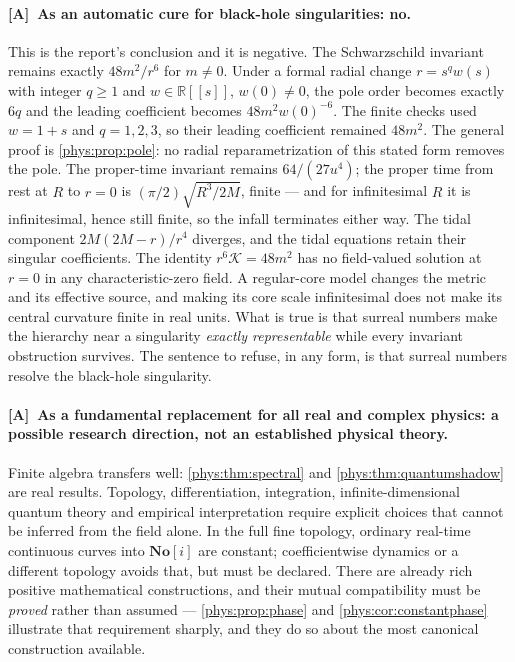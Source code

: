 \documentclass[11pt,letterpaper]{article}
\numberwithin{equation}{section}
\theoremstyle{definition}
\theoremstyle{remark}
\newcommand{\SC}{\mathbf{No}[i]}
\newcommand{\R}{\mathbb R}
\newcommand{\Kret}{\mathcal K}
\newcommand{\TA}{\textcolor{TierA}{\textsf{\bfseries[A]}}}
\begin{document}
\paragraph{\TA\ As an automatic cure for black-hole singularities: no.}
This is the report's conclusion and it is negative. The Schwarzschild invariant
remains exactly $48m^{2}/r^{6}$ for $m\ne0$. Under a formal radial change
$r=s^{q}w(s)$ with integer $q\ge1$ and $w\in\R[[s]]$, $w(0)\ne0$, the pole
order becomes exactly $6q$ and the leading coefficient becomes
$48m^{2}w(0)^{-6}$. The finite checks used $w=1+s$ and $q=1,2,3$, so their
leading coefficient remained $48m^{2}$. The general proof is
\cref{phys:prop:pole}: no radial reparametrization of this stated form
removes the pole. The proper-time invariant remains $64/(27u^{4})$; the
proper time from rest at $R$ to $r=0$ is $(\pi/2)\sqrt{R^{3}/2M}$, finite ---
and for infinitesimal $R$ it is infinitesimal, hence still finite, so the
infall terminates either way. The tidal component $2M(2M-r)/r^{4}$ diverges,
and the tidal equations retain their singular coefficients. The identity
$r^{6}\Kret=48m^{2}$ has no field-valued solution at $r=0$ in any
characteristic-zero field. A regular-core model changes the metric and its
effective source, and making its core scale infinitesimal does not make its
central curvature finite in real units. What is true is that surreal numbers
make the hierarchy near a singularity \emph{exactly representable} while every
invariant obstruction survives. The sentence to refuse, in any form, is that
surreal numbers resolve the black-hole singularity.

\paragraph{\TA\ As a fundamental replacement for all real and complex physics:
a possible research direction, not an established physical theory.}
Finite algebra transfers well: \cref{phys:thm:spectral} and
\cref{phys:thm:quantumshadow} are real results. Topology, differentiation,
integration, infinite-dimensional quantum theory and empirical interpretation
require explicit choices that cannot be inferred from the field alone. In the
full fine topology, ordinary real-time continuous curves into $\SC$ are
constant; coefficientwise dynamics or a different topology avoids that, but
must be declared. There are already rich positive mathematical constructions,
and their mutual compatibility must be \emph{proved} rather than assumed ---
\cref{phys:prop:phase} and \cref{phys:cor:constantphase} illustrate that
requirement sharply, and they do so about the most canonical construction
available.
\end{document}
